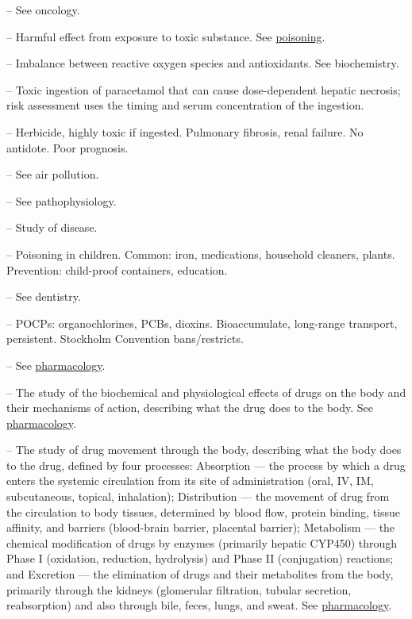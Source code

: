 -- See oncology.

-- Harmful effect from exposure to toxic substance. See \hyperlink{Poisoning}{poisoning}.

-- Imbalance between reactive oxygen species and antioxidants. See biochemistry.

-- Toxic ingestion of paracetamol that can cause dose-dependent hepatic necrosis; risk assessment uses the timing and serum concentration of the ingestion.

-- Herbicide, highly toxic if ingested. Pulmonary fibrosis, renal failure. No antidote. Poor prognosis.

-- See air pollution.

-- See pathophysiology.

-- Study of disease.

-- Poisoning in children. Common: iron, medications, household cleaners, plants. Prevention: child-proof containers, education.

-- See dentistry.

-- POCPs: organochlorines, PCBs, dioxins. Bioaccumulate, long-range transport, persistent. Stockholm Convention bans/restricts.

-- See \hyperlink{Pharmacology}{pharmacology}.

-- The study of the biochemical and physiological effects of drugs on the body and their mechanisms of action, describing what the drug does to the body. See \hyperlink{Pharmacology}{pharmacology}.

-- The study of drug movement through the body, describing what the body does to the drug, defined by four processes: Absorption — the process by which a drug enters the systemic circulation from its site of administration (oral, IV, IM, subcutaneous, topical, inhalation); Distribution — the movement of drug from the circulation to body tissues, determined by blood flow, protein binding, tissue affinity, and barriers (blood-brain barrier, placental barrier); Metabolism — the chemical modification of drugs by enzymes (primarily hepatic CYP450) through Phase I (oxidation, reduction, hydrolysis) and Phase II (conjugation) reactions; and Excretion — the elimination of drugs and their metabolites from the body, primarily through the kidneys (glomerular filtration, tubular secretion, reabsorption) and also through bile, feces, lungs, and sweat. See \hyperlink{Pharmacology}{pharmacology}.

